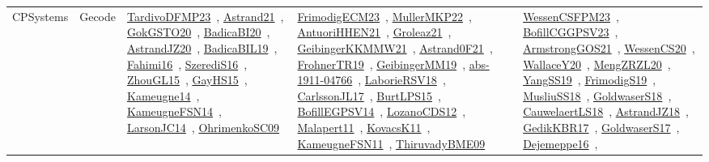 {\begin{longtable}{lp{3cm}>{\raggedright\arraybackslash}p{6cm}>{\raggedright\arraybackslash}p{6cm}>{\raggedright\arraybackslash}p{8cm}}
\index{Gecode}\index{CPSystems!Gecode}CPSystems & Gecode & \href{../works/TardivoDFMP23.pdf}{TardivoDFMP23}~\cite{TardivoDFMP23}, \href{../works/Astrand21.pdf}{Astrand21}~\cite{Astrand21}, \href{../works/GokGSTO20.pdf}{GokGSTO20}~\cite{GokGSTO20}, \href{../works/BadicaBI20.pdf}{BadicaBI20}~\cite{BadicaBI20}, \href{../works/AstrandJZ20.pdf}{AstrandJZ20}~\cite{AstrandJZ20}, \href{../works/BadicaBIL19.pdf}{BadicaBIL19}~\cite{BadicaBIL19}, \href{../works/Fahimi16.pdf}{Fahimi16}~\cite{Fahimi16}, \href{../works/SzerediS16.pdf}{SzerediS16}~\cite{SzerediS16}, \href{../works/ZhouGL15.pdf}{ZhouGL15}~\cite{ZhouGL15}, \href{../works/GayHS15.pdf}{GayHS15}~\cite{GayHS15}, \href{../works/Kameugne14.pdf}{Kameugne14}~\cite{Kameugne14}, \href{../works/KameugneFSN14.pdf}{KameugneFSN14}~\cite{KameugneFSN14}, \href{../works/LarsonJC14.pdf}{LarsonJC14}~\cite{LarsonJC14}, \href{../works/OhrimenkoSC09.pdf}{OhrimenkoSC09}~\cite{OhrimenkoSC09} & \href{../works/FrimodigECM23.pdf}{FrimodigECM23}~\cite{FrimodigECM23}, \href{../works/MullerMKP22.pdf}{MullerMKP22}~\cite{MullerMKP22}, \href{../works/AntuoriHHEN21.pdf}{AntuoriHHEN21}~\cite{AntuoriHHEN21}, \href{../works/Groleaz21.pdf}{Groleaz21}~\cite{Groleaz21}, \href{../works/GeibingerKKMMW21.pdf}{GeibingerKKMMW21}~\cite{GeibingerKKMMW21}, \href{../works/Astrand0F21.pdf}{Astrand0F21}~\cite{Astrand0F21}, \href{../works/FrohnerTR19.pdf}{FrohnerTR19}~\cite{FrohnerTR19}, \href{../works/GeibingerMM19.pdf}{GeibingerMM19}~\cite{GeibingerMM19}, \href{../works/abs-1911-04766.pdf}{abs-1911-04766}~\cite{abs-1911-04766}, \href{../works/LaborieRSV18.pdf}{LaborieRSV18}~\cite{LaborieRSV18}, \href{../works/CarlssonJL17.pdf}{CarlssonJL17}~\cite{CarlssonJL17}, \href{../works/BurtLPS15.pdf}{BurtLPS15}~\cite{BurtLPS15}, \href{../works/BofillEGPSV14.pdf}{BofillEGPSV14}~\cite{BofillEGPSV14}, \href{../works/LozanoCDS12.pdf}{LozanoCDS12}~\cite{LozanoCDS12}, \href{../works/Malapert11.pdf}{Malapert11}~\cite{Malapert11}, \href{../works/KovacsK11.pdf}{KovacsK11}~\cite{KovacsK11}, \href{../works/KameugneFSN11.pdf}{KameugneFSN11}~\cite{KameugneFSN11}, \href{../works/ThiruvadyBME09.pdf}{ThiruvadyBME09}~\cite{ThiruvadyBME09} & \href{../works/WessenCSFPM23.pdf}{WessenCSFPM23}~\cite{WessenCSFPM23}, \href{../works/BofillCGGPSV23.pdf}{BofillCGGPSV23}~\cite{BofillCGGPSV23}, \href{../works/ArmstrongGOS21.pdf}{ArmstrongGOS21}~\cite{ArmstrongGOS21}, \href{../works/WessenCS20.pdf}{WessenCS20}~\cite{WessenCS20}, \href{../works/WallaceY20.pdf}{WallaceY20}~\cite{WallaceY20}, \href{../works/MengZRZL20.pdf}{MengZRZL20}~\cite{MengZRZL20}, \href{../works/YangSS19.pdf}{YangSS19}~\cite{YangSS19}, \href{../works/FrimodigS19.pdf}{FrimodigS19}~\cite{FrimodigS19}, \href{../works/MusliuSS18.pdf}{MusliuSS18}~\cite{MusliuSS18}, \href{../works/GoldwaserS18.pdf}{GoldwaserS18}~\cite{GoldwaserS18}, \href{../works/CauwelaertLS18.pdf}{CauwelaertLS18}~\cite{CauwelaertLS18}, \href{../works/AstrandJZ18.pdf}{AstrandJZ18}~\cite{AstrandJZ18}, \href{../works/GedikKBR17.pdf}{GedikKBR17}~\cite{GedikKBR17}, \href{../works/GoldwaserS17.pdf}{GoldwaserS17}~\cite{GoldwaserS17}, \href{../works/Dejemeppe16.pdf}{Dejemeppe16}~\cite{Dejemeppe16}, 
\end{longtable}}
